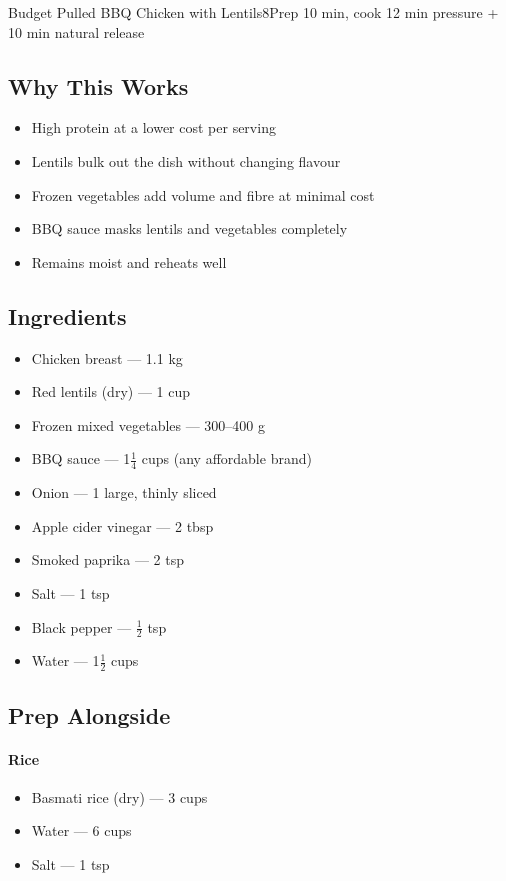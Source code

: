 \begin{recipebox}{Budget Pulled BBQ Chicken with Lentils}{8}{Prep 10 min, cook 12 min pressure + 10 min natural release}
\subsection*{Why This Works}
\begin{itemize}
    \item High protein at a lower cost per serving
    \item Lentils bulk out the dish without changing flavour
    \item Frozen vegetables add volume and fibre at minimal cost
    \item BBQ sauce masks lentils and vegetables completely
    \item Remains moist and reheats well
\end{itemize}

\subsection*{Ingredients}
\begin{itemize}
    \item Chicken breast — 1.1 kg
    \item Red lentils (dry) — 1 cup
    \item Frozen mixed vegetables — 300--400 g
    \item BBQ sauce — 1$\tfrac{1}{4}$ cups (any affordable brand)
    \item Onion — 1 large, thinly sliced
    \item Apple cider vinegar — 2 tbsp
    \item Smoked paprika — 2 tsp
    \item Salt — 1 tsp
    \item Black pepper — $\tfrac{1}{2}$ tsp
    \item Water — 1$\tfrac{1}{2}$ cups
\end{itemize}

\subsection*{Prep Alongside}

\paragraph{Rice}
\begin{itemize}
    \item Basmati rice (dry) — 3 cups
    \item Water — 6 cups
    \item Salt — 1 tsp
\end{itemize}


\end{recipebox}
